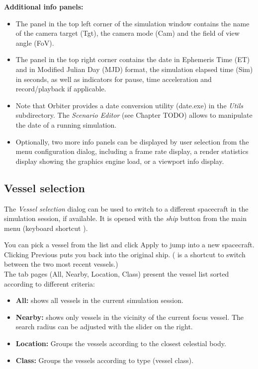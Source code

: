 \documentclass[Orbiter User Manual.tex]{subfiles}
\begin{document}
\noindent
\textbf{Additional info panels:}

\begin{itemize}
\item The panel in the top left corner of the simulation window contains the name of the camera target (Tgt), the camera mode (Cam) and the field of view angle (FoV).
\item The panel in the top right corner contains the date in Ephemeris Time (ET) and in Modified Julian Day (MJD) format, the simulation elapsed time (Sim) in seconds, as well as indicators for pause, time acceleration and record/playback if applicable.
\item Note that Orbiter provides a date conversion utility (date.exe) in the \textit{Utils} subdirectory. The \textit{Scenario Editor} (see Chapter TODO) allows to manipulate the date of a running simulation.
\item Optionally, two more info panels can be displayed by user selection from the menu configuration dialog, including a frame rate display, a render statistics display showing the graphics engine load, or a viewport info display.
\end{itemize}


\subsection{Vessel selection}
The \textit{Vessel selection} dialog can be used to switch to a different spacecraft in the simulation session, if available. It is opened with the \textit{ship} button from the main menu (keyboard shortcut ).

\begin{figure}[H]
	\centering
\end{figure}

\noindent
You can pick a vessel from the list and click Apply to jump into a new spacecraft. Clicking Previous puts you back into the original ship. (\Ctrl{} is a shortcut to switch between the two most recent vessels.)\\
The tab pages (All, Nearby, Location, Class) present the vessel list sorted according to different criteria:

\begin{itemize}
\item \textbf{All:} shows all vessels in the current simulation session.
\item \textbf{Nearby:} shows only vessels in the vicinity of the current focus vessel. The search radius can be adjusted with the slider on the right.
\item \textbf{Location:} Groups the vessels according to the closest celestial body.
\item \textbf{Class:} Groups the vessels according to type (vessel class).
\end{itemize}
\end{document}
